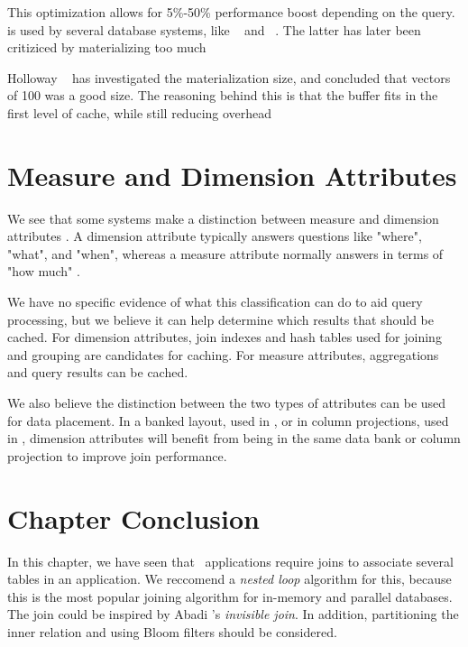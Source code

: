 This optimization allows for 5\%-50\% performance boost depending on the query.  is used by several database systems, like \ibm~\cite{Raman2013-em} and \monetdb~\cite{Boncz2002-yj}. The latter has later been critiziced by materializing too much \cite{Boncz2005-wj}

Holloway \ea~\cite{Holloway2008-rr} has investigated the materialization size, and concluded that vectors of 100 was a good size. The reasoning behind this is that the buffer fits in the first level of cache, while still reducing overhead

\section{Measure and Dimension Attributes}
\label{sec:Measure and Dimension Attributes}
We see that some systems make a distinction between measure and dimension attributes \cite{Johnson2008-cp, Kamkolkar2015-iq}. A dimension attribute typically answers questions like "where", "what", and "when", whereas a measure attribute normally answers in terms of "how much" \cite{noauthor_undated-es}. 

We have no specific evidence of what this classification can do to aid query processing, but we believe it can help determine which results that should be cached. For dimension attributes, join indexes and hash tables used for joining and grouping are candidates for caching. For measure attributes, aggregations and query results can be cached.

We also believe the distinction between the two types of attributes can be used for data placement. In a banked layout, used in \blink, or in column projections, used in \cstore, dimension attributes will benefit from being in the same data bank or column projection to improve join performance.

\section{Chapter Conclusion}
\label{sec:Chapter Conclusion}
In this chapter, we have seen that \bd~applications require joins to associate several tables in an application. We reccomend a \textit{nested loop} algorithm for this, because this is the most popular joining algorithm for in-memory and parallel databases. The join could be inspired by Abadi \ea's \textit{invisible join}. In addition, partitioning the inner relation and using Bloom filters should be considered.

